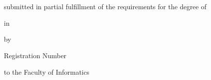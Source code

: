 \begin{otherlanguage}{english}

\begin{center}
{\ \vspace{3.4cm}}

\begin{minipage}[t][2.8cm][t]{\textwidth}%
\begin{center}
{\thesistitlefontHUGE\sffamily\bfseries\tuinfthesistitle}\\
\bigskip
{\thesistitlefonthuge\sffamily\bfseries\tuinfthesissubtitle}
\end{center}
\end{minipage}

\vspace{1.3cm}

{\thesistitlefontLARGE\sffamily \tuinfthesistypeen}

\vspace{6mm}

{\thesistitlefontlarge\sffamily submitted in partial fulfillment of the requirements for the degree of}

\vspace{6mm}

{\thesistitlefontLARGE\sffamily\bfseries \tuinfthesisdegreeen}

\vspace{6mm}

{\thesistitlefontlarge\sffamily in}

\vspace{6mm}

{\thesistitlefontLarge\sffamily\bfseries \tuinfthesiscurriculumen}

\vspace{6.5mm}

{\thesistitlefontlarge\sffamily by}

\vspace{6mm}

{\thesistitlefontLarge\sffamily\bfseries \tuinfthesisauthor}

\vspace{1.5mm}

{\thesistitlefontlarge\sffamily Registration Number \tuinfthesismatrikelno} 

\vspace{1.4cm}

\begin{minipage}[t][1.6cm][t]{\textwidth}%
  \vspace{0pt}\raggedright\thesistitlefontnormalsize\sffamily
  to the Faculty of Informatics 


\end{minipage}
\end{center}
\end{otherlanguage}
